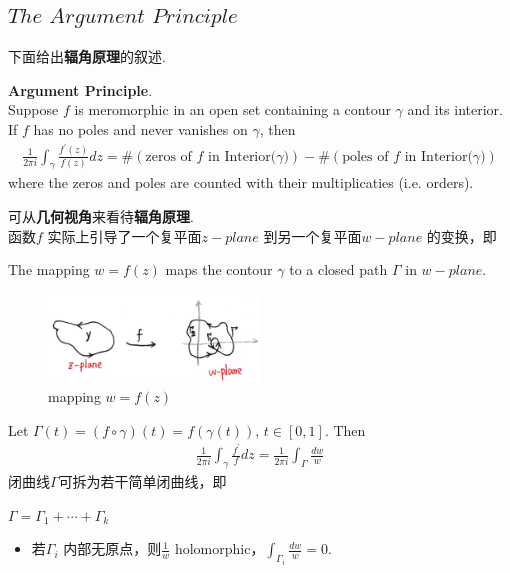 \subsection{$The \,\, Argument \,\, Principle$}
	下面给出\textbf{辐角原理}的叙述.
	\begin{thm}\label{thm 9.2.1}
		\textbf{Argument Principle}. \\
		Suppose $f$ is meromorphic in an open set containing a contour $\gamma$ and its interior. If $f$ has no poles and never vanishes on $\gamma$, then
		\begin{align}
			\frac{1}{2 \pi i} \int_{\gamma}{\frac{f^{'}(z)}{f(z)} dz}
			= \# \left( \text{zeros of $f$ in Interior($\gamma$)} \right) - \# \left( \text{poles of $f$ in Interior($\gamma$)} \right)
		\end{align}
		where the zeros and poles are counted with their multiplicaties (i.e. orders).
		
		\vspace{2em}
		
		\begin{rmk}
			可从\textbf{几何视角}来看待\textbf{辐角原理}. \\
			函数$f$ 实际上引导了一个复平面$z-plane$ 到另一个复平面$w-plane$ 的变换，即
			\begin{center}
				The mapping $w = f(z)$ maps the contour $\gamma$ to a closed path $\Gamma$ in $w-plane$.
			\end{center}
			
			\begin{figure}[htbp]  %
				\centering  %
				\includegraphics[width=0.5\textwidth]{figure/9.2.1-1} %
				\caption{mapping $w = f(z)$} %
				\label{pic 9.2.1-1}
			\end{figure}
			
			Let $\Gamma(t) = (f \circ \gamma)(t) = f(\gamma(t))$, $t \in [0 , 1]$. Then
			\begin{align}
				\frac{1}{2 \pi i} \int_{\gamma}{\frac{f^{'}}{f} dz}
				= \frac{1}{2 \pi i} \int_{\Gamma}{\frac{dw}{w}}
			\end{align}
			闭曲线$\Gamma$可拆为若干简单闭曲线，即
			\begin{center}
				$\Gamma = \Gamma_1 + \cdots + \Gamma_k$
			\end{center}
			\begin{itemize}
				\item 若$\Gamma_i$ 内部无原点，则$\frac{1}{w}$ holomorphic，$\int_{\Gamma_i}{\frac{dw}{w}} = 0$.
				

\end{itemize}
\end{rmk}
\end{thm}
